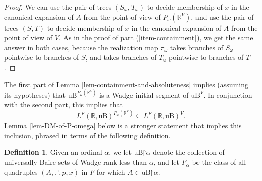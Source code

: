 \documentclass[fleqn, 11pt]{amsart}
\theoremstyle{plain}
\theoremstyle{definition}
\newtheorem{defn}[thm]{Definition} \newtheorem*{defn*}{Definition}
\theoremstyle{remark}
\newcommand{\Hom}{\mathrm{Hom}}
\newcommand{\uB}{\mathrm{uB}}
\newcommand{\bbR}{\mathbb{R}}
\newcommand{\Col}{\mathrm{Col}}
\newcommand{\restrict}{\mathord{\restriction}}
\begin{document}
\begin{proof}
We can use the pair of trees $(S_{\omega}, T_{\omega})$
to decide membership of $x$ in the canonical expansion of $A$ from the point of view of $P_\omega(\mathbb{R}^V)$, and use the pair of trees $(S,T)$ to decide membership of $x$ in the canonical expansion of $A$ from the point of view of $V$. As in the proof of part (\ref{item-containment}), we get the same answer in both cases, because the realization map $\pi_\omega$ takes branches of 
$S_{\omega}$
pointwise to branches of $S$, and takes branches of 
$T_{\omega}$
pointwise to branches of $T$.
\end{proof}

The first part of Lemma \ref{lem-containment-and-absoluteness} implies (assuming its hypotheses) that $\uB^{P_{\omega}(\bbR^{V})}$ is a Wadge-initial segment of $\uB^{V}$. In conjunction with the second part, this implies that 
\[ L^F(\mathbb{R}, \uB)^{P_\omega(\mathbb{R}^V)} \subseteq L^F(\mathbb{R}, \uB)^V.\]
Lemma \ref{lem-DM-of-P-omega} below is a stronger statement that implies this inclusion, phrased in terms of the following definition.


\begin{defn} Given an ordinal $\alpha$, we let $\uB \restrict \alpha$ denote the collection of universally Baire sets of Wadge rank less than $\alpha$,  and let $F_\alpha$ be the class of all quadruples $(A,\mathbb{P},p,\dot{x})$ in $F$ for which $A \in \uB \restrict \alpha$.  
\end{defn}

\end{document}
